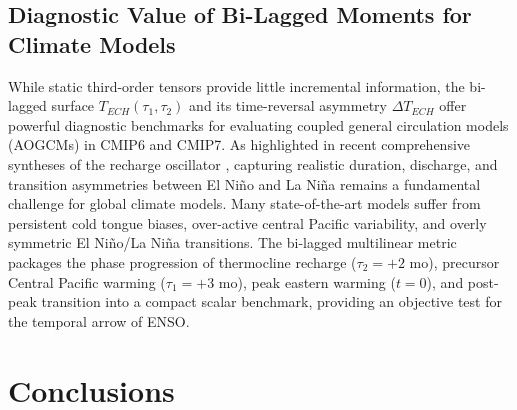 \documentclass[11pt,a4paper]{article}
\begin{document}
\subsection{Diagnostic Value of Bi-Lagged Moments for Climate Models}
While static third-order tensors provide little incremental information, the bi-lagged surface $T_{ECH}(\tau_1, \tau_2)$ and its time-reversal asymmetry $\Delta T_{ECH}$ offer powerful diagnostic benchmarks for evaluating coupled general circulation models (AOGCMs) in CMIP6 and CMIP7. As highlighted in recent comprehensive syntheses of the recharge oscillator \citep{vialard2025recharge, han2026realistic}, capturing realistic duration, discharge, and transition asymmetries between El Ni\~no and La Ni\~na remains a fundamental challenge for global climate models. Many state-of-the-art models suffer from persistent cold tongue biases, over-active central Pacific variability, and overly symmetric El Ni\~no/La Ni\~na transitions. The bi-lagged multilinear metric packages the phase progression of thermocline recharge ($\tau_2 = +2$ mo), precursor Central Pacific warming ($\tau_1 = +3$ mo), peak eastern warming ($t=0$), and post-peak transition into a compact scalar benchmark, providing an objective test for the temporal arrow of ENSO.

\section{Conclusions}
\end{document}
